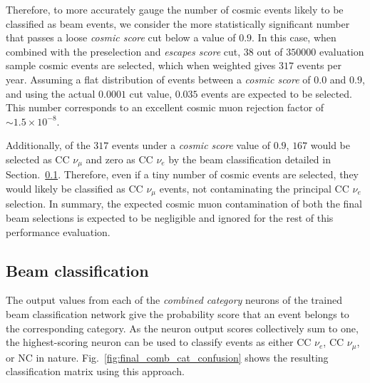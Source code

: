 Therefore, to more accurately gauge the number of cosmic events likely to be classified as beam
events, we consider the more statistically significant number that passes a loose \emph{cosmic
score} cut below a value of $0.9$. In this case, when combined with the preselection and
\emph{escapes score} cut, $38$ out of $350000$ evaluation sample cosmic events are selected, which
when weighted gives $317$ events per year. Assuming a flat distribution of events between a
\emph{cosmic score} of $0.0$ and $0.9$, and using the actual $0.0001$ cut value, $0.035$ events
are expected to be selected. This number corresponds to an excellent cosmic muon rejection factor
of $\sim1.5\times10^{-8}$.

Additionally, of the $317$ events under a \emph{cosmic score} value of $0.9$, $167$ would be
selected as CC $\nu_{\mu}$ and zero as CC $\nu_{e}$ by the beam classification detailed in
Section.~\ref{sec:results_eval_beam}. Therefore, even if a tiny number of cosmic events are
selected, they would likely be classified as CC $\nu_{\mu}$ events, not contaminating the
principal CC $\nu_{e}$ selection. In summary, the expected cosmic muon contamination of both the
final beam selections is expected to be negligible and ignored for the rest of this performance
evaluation.

\subsection{Beam classification} %
\label{sec:results_eval_beam} %

The output values from each of the \emph{combined category} neurons of the trained beam
classification network give the probability score that an event belongs to the corresponding
category. As the neuron output scores collectively sum to one, the highest-scoring neuron can be
used to classify events as either CC $\nu_{e}$, CC $\nu_{\mu}$, or NC in nature.
Fig.~\ref{fig:final_comb_cat_confusion} shows the resulting classification matrix using this
approach.

